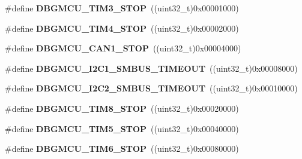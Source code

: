 \begin{DoxyCompactItemize}
\item 
\hypertarget{group__DBGMCU__Exported__Constants_ga28c01c2c30bed78e51d997007986fac9}{
\#define {\bfseries DBGMCU\_\-TIM3\_\-STOP}~((uint32\_\-t)0x00001000)}
\label{group__DBGMCU__Exported__Constants_ga28c01c2c30bed78e51d997007986fac9}

\item 
\hypertarget{group__DBGMCU__Exported__Constants_gac87363a4018e2b23a907cfaf836494f1}{
\#define {\bfseries DBGMCU\_\-TIM4\_\-STOP}~((uint32\_\-t)0x00002000)}
\label{group__DBGMCU__Exported__Constants_gac87363a4018e2b23a907cfaf836494f1}

\item 
\hypertarget{group__DBGMCU__Exported__Constants_ga5ef70e050d1a95f350b6585336a55ca8}{
\#define {\bfseries DBGMCU\_\-CAN1\_\-STOP}~((uint32\_\-t)0x00004000)}
\label{group__DBGMCU__Exported__Constants_ga5ef70e050d1a95f350b6585336a55ca8}

\item 
\hypertarget{group__DBGMCU__Exported__Constants_ga1c0566af96833376cf1af98449cc914b}{
\#define {\bfseries DBGMCU\_\-I2C1\_\-SMBUS\_\-TIMEOUT}~((uint32\_\-t)0x00008000)}
\label{group__DBGMCU__Exported__Constants_ga1c0566af96833376cf1af98449cc914b}

\item 
\hypertarget{group__DBGMCU__Exported__Constants_ga316f8eba36b7a796dd3c6b7d6640b4bf}{
\#define {\bfseries DBGMCU\_\-I2C2\_\-SMBUS\_\-TIMEOUT}~((uint32\_\-t)0x00010000)}
\label{group__DBGMCU__Exported__Constants_ga316f8eba36b7a796dd3c6b7d6640b4bf}

\item 
\hypertarget{group__DBGMCU__Exported__Constants_gaa66feea7d5f2c253fe3f431f9dd4bd1e}{
\#define {\bfseries DBGMCU\_\-TIM8\_\-STOP}~((uint32\_\-t)0x00020000)}
\label{group__DBGMCU__Exported__Constants_gaa66feea7d5f2c253fe3f431f9dd4bd1e}

\item 
\hypertarget{group__DBGMCU__Exported__Constants_gaf97e21534b3aa9482af496497a37ff4b}{
\#define {\bfseries DBGMCU\_\-TIM5\_\-STOP}~((uint32\_\-t)0x00040000)}
\label{group__DBGMCU__Exported__Constants_gaf97e21534b3aa9482af496497a37ff4b}

\item 
\hypertarget{group__DBGMCU__Exported__Constants_ga076cf7d18c7019e99f5f15962ab317eb}{
\#define {\bfseries DBGMCU\_\-TIM6\_\-STOP}~((uint32\_\-t)0x00080000)}
\label{group__DBGMCU__Exported__Constants_ga076cf7d18c7019e99f5f15962ab317eb}


\end{DoxyCompactItemize}
